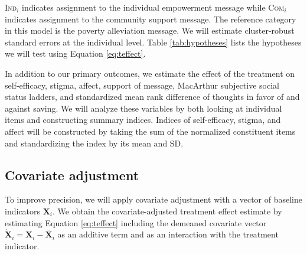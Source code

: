 \documentclass[11pt, a4paper]{article}\usepackage[]{graphicx}\usepackage[]{color}
\begin{document}
        \textsc{Ind}$_{i}$ indicates assignment to the individual empowerment message while \textsc{Com}$_{i}$ indicates assignment to the community support message. The reference category in this model is the poverty alleviation message. We will estimate cluster-robust standard errors at the individual level. Table \ref{tab:hypotheses} lists the hypotheses we will test using Equation \ref{eq:teffect}.

        \begin{table}[h]
        \centering
        \caption{Hypothesis tests}
        \label{tab:hypotheses}
        \end{table}

        In addition to our primary outcomes, we estimate the effect of the treatment on self-efficacy, stigma, affect, support of message, MacArthur subjective social status ladders, and standardized mean rank difference of thoughts in favor of and against saving. We will analyze these variables by both looking at individual items and constructing summary indices. Indices of self-efficacy, stigma, and affect will be constructed by taking the sum of the normalized constituent items and standardizing the index by its mean and SD.

    \subsection{Covariate adjustment}

        To improve precision, we will apply covariate adjustment with a vector of baseline indicators $\mathbf{X}_i$. We obtain the covariate-adjusted treatment effect estimate by estimating Equation \ref{eq:teffect} including the demeaned covariate vector $\mathbf{\dot X}_{i} = \mathbf{X}_{i} - \mathbf{\bar X}_{i}$ as an additive term and as an interaction with the treatment indicator.
\end{document}
